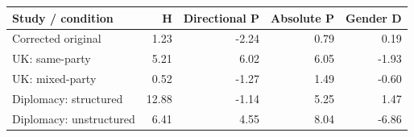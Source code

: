 
\begin{tabular}{lrrrr}
\toprule
Study / condition & H & Directional P & Absolute P & Gender D\\
\midrule
Corrected original & 1.23 & -2.24 & 0.79 & 0.19\\
UK: same-party & 5.21 & 6.02 & 6.05 & -1.93\\
UK: mixed-party & 0.52 & -1.27 & 1.49 & -0.60\\
Diplomacy: structured & 12.88 & -1.14 & 5.25 & 1.47\\
Diplomacy: unstructured & 6.41 & 4.55 & 8.04 & -6.86\\
\bottomrule
\end{tabular}
